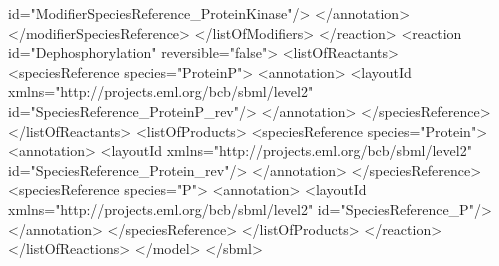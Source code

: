 {\begin{example}
                 id="ModifierSpeciesReference_ProteinKinase"/>
      </annotation>
     </modifierSpeciesReference>
    </listOfModifiers>
   </reaction>
   <reaction id="Dephosphorylation" reversible="false">
    <listOfReactants>
     <speciesReference species="ProteinP">
      <annotation>
       <layoutId xmlns="http://projects.eml.org/bcb/sbml/level2" 
                 id="SpeciesReference_ProteinP_rev"/>
      </annotation>
     </speciesReference>
    </listOfReactants>
    <listOfProducts>
     <speciesReference species="Protein">
      <annotation>
       <layoutId xmlns="http://projects.eml.org/bcb/sbml/level2" 
                 id="SpeciesReference_Protein_rev"/>
      </annotation>
     </speciesReference>
     <speciesReference species="P">
      <annotation>
      <layoutId xmlns="http://projects.eml.org/bcb/sbml/level2" 
                id="SpeciesReference_P"/>
      </annotation>
     </speciesReference>
    </listOfProducts>
   </reaction>
  </listOfReactions>
 </model>
</sbml>
\end{example}
}




